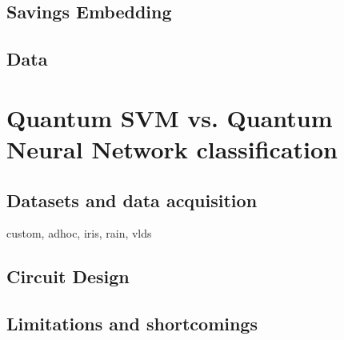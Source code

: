 \subsection{Savings Embedding}
\subsection{Data}

\newpage

\section{Quantum SVM vs. Quantum Neural Network classification}

\subsection{Datasets and data acquisition}
custom, adhoc, iris, rain, vlds

\subsection{Circuit Design}

\subsection{Limitations and shortcomings}

\newpage
